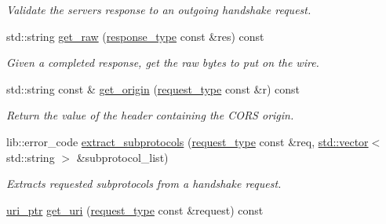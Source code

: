 \begin{DoxyCompactItemize}
\begin{DoxyCompactList}\small\item\em Validate the server\textquotesingle{}s response to an outgoing handshake request. \end{DoxyCompactList}\item 
\mbox{\label{classwebsocketpp_1_1processor_1_1hybi13_ab1055402f24f2977c8141eab25b5ee26}} 
std\+::string \mbox{\hyperlink{classwebsocketpp_1_1processor_1_1hybi13_ab1055402f24f2977c8141eab25b5ee26}{get\+\_\+raw}} (\mbox{\hyperlink{classwebsocketpp_1_1http_1_1parser_1_1response}{response\+\_\+type}} const \&res) const
\begin{DoxyCompactList}\small\item\em Given a completed response, get the raw bytes to put on the wire. \end{DoxyCompactList}\item 
\mbox{\label{classwebsocketpp_1_1processor_1_1hybi13_a02883529d8bf03682c67a4d81a0ef7d5}} 
std\+::string const  \& \mbox{\hyperlink{classwebsocketpp_1_1processor_1_1hybi13_a02883529d8bf03682c67a4d81a0ef7d5}{get\+\_\+origin}} (\mbox{\hyperlink{classwebsocketpp_1_1http_1_1parser_1_1request}{request\+\_\+type}} const \&r) const
\begin{DoxyCompactList}\small\item\em Return the value of the header containing the C\+O\+RS origin. \end{DoxyCompactList}\item 
lib\+::error\+\_\+code \mbox{\hyperlink{classwebsocketpp_1_1processor_1_1hybi13_a3d3b0e51df97cd7c8dcde00fb3003a34}{extract\+\_\+subprotocols}} (\mbox{\hyperlink{classwebsocketpp_1_1http_1_1parser_1_1request}{request\+\_\+type}} const \&req, \mbox{\hyperlink{classstd_1_1vector}{std\+::vector}}$<$ std\+::string $>$ \&subprotocol\+\_\+list)
\begin{DoxyCompactList}\small\item\em Extracts requested subprotocols from a handshake request. \end{DoxyCompactList}\item 
\mbox{\label{classwebsocketpp_1_1processor_1_1hybi13_a49ae173c8cdef4e78c472a46200df8d0}} 
\mbox{\hyperlink{namespacewebsocketpp_aae370ea5ac83a8ece7712cb39fc23f5b}{uri\+\_\+ptr}} \mbox{\hyperlink{classwebsocketpp_1_1processor_1_1hybi13_a49ae173c8cdef4e78c472a46200df8d0}{get\+\_\+uri}} (\mbox{\hyperlink{classwebsocketpp_1_1http_1_1parser_1_1request}{request\+\_\+type}} const \&request) const

\end{DoxyCompactItemize}
